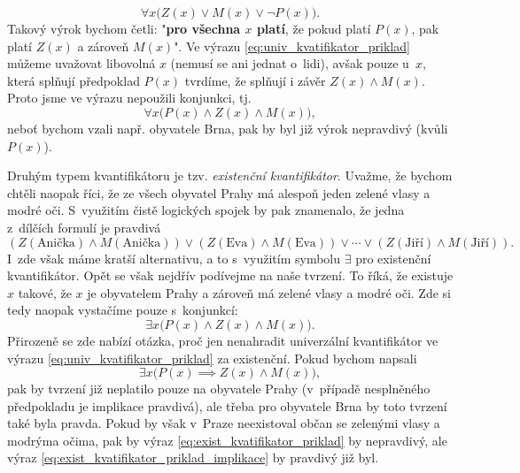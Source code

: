\begin{equation*}
    \forall x \bigl(Z(x) \lor M(x) \lor \neg P(x)\bigr).
\end{equation*}
Takový výrok bychom četli: "\textbf{pro všechna $x$ platí}, že pokud platí $P(x)$, pak platí $Z(x)$ a zároveň $M(x)$". Ve výrazu \eqref{eq:univ_kvatifikator_priklad} můžeme uvažovat libovolná $x$ (nemusí se ani jednat o~lidi), avšak pouze u~$x$, která splňují předpoklad $P(x)$ tvrdíme, že splňují i závěr $Z(x) \land M(x)$. Proto jsme ve výrazu nepoužili konjunkci, tj.
\begin{equation*}
    \forall x \bigl(P(x) \land Z(x) \land M(x)\bigr),
\end{equation*}
neboť bychom vzali např. obyvatele Brna, pak by byl již výrok nepravdivý (kvůli $P(x)$).

Druhým typem kvantifikátoru je tzv. \emph{existenční kvantifikátor}. Uvažme, že bychom chtěli naopak říci, že ze všech obyvatel Prahy má alespoň jeden zelené vlasy a modré oči. S~využitím čistě logických spojek by pak znamenalo, že jedna z~dílčích formulí je pravdivá
\begin{equation*}
    (Z({\text{Anička}}) \land M({\text{Anička}})) \lor (Z({\text{Eva}}) \land M({\text{Eva}})) \lor \cdots \lor (Z({\text{Jiří}}) \land M({\text{Jiří}})).
\end{equation*}
I~zde však máme kratší alternativu, a to s~využitím symbolu $\exists$ pro existenční kvantifikátor. Opět se však nejdřív podívejme na naše tvrzení. To říká, že existuje $x$ takové, že $x$ je obyvatelem Prahy a zároveň má zelené vlasy a modré oči. Zde si tedy naopak vystačíme pouze s~konjunkcí:
\begin{equation}\label{eq:exist_kvatifikator_priklad}
    \exists x \bigl(P(x) \land Z(x) \land M(x)\bigr).
\end{equation}
Přirozeně se zde nabízí otázka, proč jen nenahradit univerzální kvantifikátor ve výrazu \eqref{eq:univ_kvatifikator_priklad} za existenční. Pokud bychom napsali
\begin{equation}\label{eq:exist_kvatifikator_priklad_implikace}
    \exists x \bigl(P(x) \implies Z(x) \land M(x)\bigr),
\end{equation}
pak by tvrzení již neplatilo pouze na obyvatele Prahy (v~případě nesplněného předpokladu je implikace pravdivá), ale třeba pro obyvatele Brna by toto tvrzení také byla pravda. Pokud by však v~Praze neexistoval občan se zelenými vlasy a modrýma očima, pak by výraz \eqref{eq:exist_kvatifikator_priklad} by nepravdivý, ale výraz \eqref{eq:exist_kvatifikator_priklad_implikace} by pravdivý již byl.
\medskip

